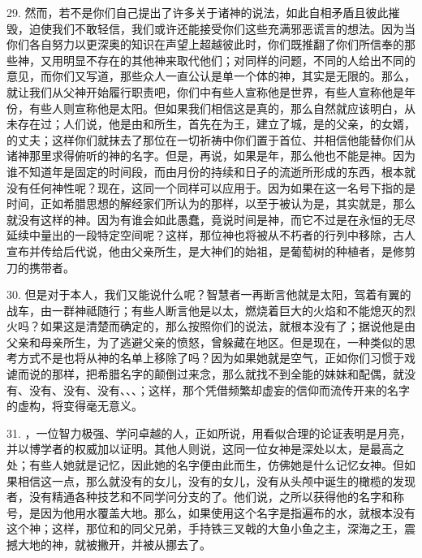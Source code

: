 29. 然而，若不是你们自己提出了许多关于诸神的说法，如此自相矛盾且彼此摧毁，迫使我们不敢轻信，我们或许还能接受你们这些充满邪恶谎言的想法。因为当你们各自努力以更深奥的知识在声望上超越彼此时，你们既推翻了你们所信奉的那些神，又用明显不存在的其他神来取代他们；对同样的问题，不同的人给出不同的意见，而你们又写道，那些众人一直公认是单一个体的神，其实是无限的。那么，就让我们从父神开始履行职责吧，你们中有些人宣称他是世界，有些人宣称他是年份，有些人则宣称他是太阳。但如果我们相信这是真的，那么自然就应该明白，从未存在过；人们说，他是由和所生，首先在为王，建立了城，是的父亲，的女婿，的丈夫；这样你们就抹去了那位在一切祈祷中你们置于首位、并相信他能替你们从诸神那里求得俯听的神的名字。但是，再说，如果是年，那么他也不能是神。因为谁不知道年是固定的时间段，而由月份的持续和日子的流逝所形成的东西，根本就没有任何神性呢？现在，这同一个同样可以应用于。因为如果在这一名号下指的是时间，正如希腊思想的解经家们所认为的那样，以至于被认为是，其实就是，那么就没有这样的神。因为有谁会如此愚蠢，竟说时间是神，而它不过是在永恒的无尽延续中量出的一段特定空间呢？这样，那位神也将被从不朽者的行列中移除，古人宣布并传给后代说，他由父亲所生，是大神们的始祖，是葡萄树的种植者，是修剪刀的携带者。\par

30. 但是对于本人，我们又能说什么呢？智慧者一再断言他就是太阳，驾着有翼的战车，由一群神祗随行；有些人断言他是以太，燃烧着巨大的火焰和不能熄灭的烈火吗？如果这是清楚而确定的，那么按照你们的说法，就根本没有了；据说他是由父亲和母亲所生，为了逃避父亲的愤怒，曾躲藏在地区。但是现在，一种类似的思考方式不是也将从神的名单上移除了吗？因为如果她就是空气，正如你们习惯于戏谑而说的那样，把希腊名字的颠倒过来念，那么就找不到全能的妹妹和配偶，就没有、没有、没有、没有、、、；这样，那个凭借频繁却虚妄的信仰而流传开来的名字的虚构，将变得毫无意义。\par

31. ，一位智力极强、学问卓越的人，正如所说，用看似合理的论证表明是月亮，并以博学者的权威加以证明。其他人则说，这同一位女神是深处以太，是最高之处；有些人她就是记忆，因此她的名字便由此而生，仿佛她是什么记忆女神。但如果相信这一点，那么就没有的女儿，没有的女儿，没有从头颅中诞生的橄榄的发现者，没有精通各种技艺和不同学问分支的了。他们说，之所以获得他的名字和称号，是因为他用水覆盖大地。那么，如果使用这个名字是指遍布的水，就根本没有这个神；这样，那位和的同父兄弟，手持铁三叉戟的大鱼小鱼之主，深海之王，震撼大地的神，就被撇开，并被从挪去了。\par

